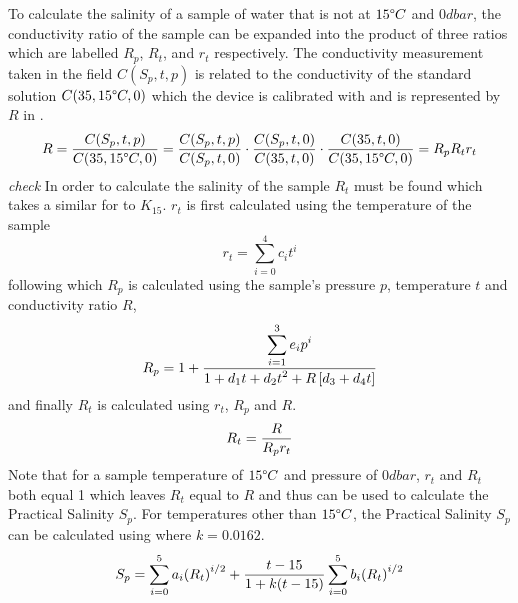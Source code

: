 To calculate the salinity of a sample of water that is not at $15\degree C$ and $0 dbar$, the conductivity ratio of the sample can be expanded into the product of three ratios which are labelled $R_p$, $R_t$, and $r_t$ respectively.
The conductivity measurement taken in the field $C(S_p, t, p)$ is related to the conductivity of the standard solution $C(35, 15\degree C, 0)$ which the device is calibrated with and is represented by $R$ in .~\cite{ioc_teos_2010}
\begin{equation}\label{eq:pss-78-full-ratio}
    R = \frac{\displaystyle C(S_p, t, p)}{\displaystyle C(35, 15\degree C, 0)} = \frac{\displaystyle C(S_p, t, p)}{\displaystyle C(S_p, t, 0)} \cdot \frac{\displaystyle C(S_p, t, 0)}{\displaystyle C(35, t, 0)} \cdot \frac{\displaystyle C(35, t, 0)}{\displaystyle C(35, 15\degree C, 0)} = R_p R_t r_t
\end{equation}
\textit{check}
In order to calculate the salinity of the sample $R_t$ must be found which takes a similar for to $K_{15}$.
$r_t$ is first calculated using the temperature of the sample 
\begin{equation}\label{eq:pss-78-rt}
    r_t = \sum_{i=0}^{4} c_i {t}^i
\end{equation}
following which $R_p$ is calculated using the sample's pressure $p$, temperature $t$ and conductivity ratio $R$,
\begin{equation}\label{eq:pss-78-rp}
    R_p = 1 + \frac{\displaystyle \sum_{i=1}^{3} e_i p^i}{\displaystyle 1 + d_1 t + d_2 {t}^2 + R\left[ d_3 + d_4 t \right]}
\end{equation}
and finally $R_t$ is calculated using $r_t$, $R_p$ and $R$.
\begin{equation}\label{eq:pss-78-Rt}
    R_t = \frac{\displaystyle R}{\displaystyle R_p r_t}
\end{equation}
Note that for a sample temperature of $15\degree C$ and pressure of $0 dbar$, $r_t$ and $R_t$ both equal 1 which leaves $R_t$ equal to $R$ and thus  can be used to calculate the Practical Salinity $S_p$.
For temperatures other than $15\degree C$, the Practical Salinity $S_p$ can be calculated using  where $k = 0.0162$.~\cite{ioc_teos_2010}
\begin{equation}\label{eq:pss-78-full}
    S_p = \sum_{i=0}^{5} a_i {(R_t)}^{i/2} + \frac{\displaystyle t-15}{\displaystyle 1+k(t-15)} \sum_{i=0}^{5} b_i {(R_t)}^{i/2}
\end{equation}

